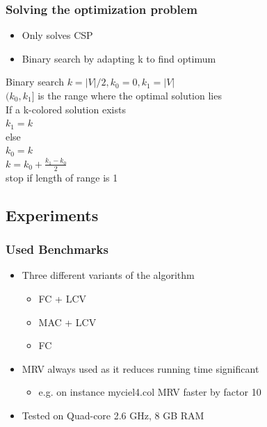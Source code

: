 \documentclass{beamer}
\begin{document}
\begin{frame}
    \frametitle{Solving the optimization problem}
    \begin{itemize}
    \item{Only solves CSP}
	\item{Binary search by adapting k to find optimum}
	\end{itemize}
	\begin{block}{Binary search}
	$k = |V|/2, k_0 = 0, k_1 = |V|$\\
	$(k_0,k_1]$ is the range where the optimal solution lies\\
	If a k-colored solution exists\\
	\quad $k_1 = k$\\
	else\\
	\quad $k_0 = k$\\
	$k = k_0 + \frac{k_1 - k_0}{2}$\\
	stop if length of range is 1
	\end{block}
   \end{frame}
\subsection{Experiments}
\begin{frame}
    \frametitle{Used Benchmarks}
	
    \begin{itemize}
    \item{Three different variants of the algorithm}
        \begin{itemize}
        \item{FC + LCV}
        \item{MAC + LCV}
        \item{FC}
        \end{itemize}
    \item{MRV always used as it reduces running time significant}
        \begin{itemize}
        \item{e.g. on instance myciel4.col MRV faster by factor 10}
		\end{itemize}    
	\item{Tested on Quad-core 2.6 GHz, 8 GB RAM}
	\end{itemize}
  \end{frame}
\end{document}
